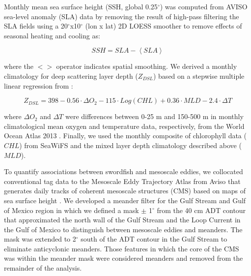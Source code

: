 Monthly mean sea surface height (SSH, global 0.25$^{\circ}$) was computed from AVISO sea-level anomaly (SLA) data by removing the result of high-pass filtering the SLA fields using a 20$^\circ$x10$^\circ$ (lon x lat) 2D LOESS smoother to remove effects of seasonal heating and cooling \citep{Chelton2011} as:

\begin{equation}
SSH = SLA - \left<SLA\right>
\end{equation}

where the $<>$ operator indicates spatial smoothing. We derived a monthly climatology for deep scattering layer depth (\(Z_{DSL}\)) based on a stepwise multiple linear regression from \citet{Bianchi2013}:

\begin{equation}
Z_{DSL} = 398 - 0.56 \cdot \Delta O_2 - 115 \cdot Log(CHL) + 0.36 \cdot MLD - 2.4 \cdot \Delta T
\label{eq:dsl}
\end{equation}

where \(\Delta O_2\) and \(\Delta T\) were differences between 0-25 m and 150-500 m in monthly climatological mean oxygen and temperature data, respectively, from the World Ocean Atlas 2013 \citep[following][]{Garcia2013, Locarnini2013}. Finally, we used the monthly composite of chlorophyll data (\(CHL\)) from SeaWiFS and the mixed layer depth climatology described above (\(MLD\)).

To quantify associations between swordfish and mesoscale eddies, we collocated conventional tag data to the Mesoscale Eddy Trajectory Atlas from Aviso that generates daily tracks of coherent mesoscale structures (CMS) based on maps of sea surface height \citep{Chelton2011}. We developed a meander filter \citep[similar to][]{Gaube2017DSR} for the Gulf Stream and Gulf of Mexico region in which we defined a mask \(\pm\) 1$^{\circ}$ from the 40 cm ADT contour that approximated the north wall of the Gulf Stream and the Loop Current in the Gulf of Mexico to distinguish between mesoscale eddies and meanders. The mask was extended to 2$^{\circ}$ south of the ADT contour in the Gulf Stream to eliminate anticyclonic meanders. Those features in which the core of the CMS was within the meander mask were considered meanders and removed from the remainder of the analysis.


